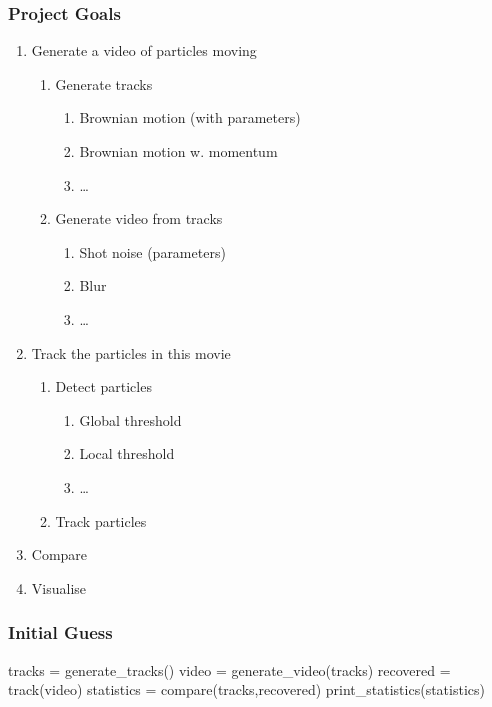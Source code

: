 \begin{frame}[fragile]
\frametitle{Project Goals}

\begin{enumerate}
\item Generate a video of particles moving
\begin{enumerate}[a]
\item<2-> Generate tracks
\begin{enumerate}[i]
\item<3-> \alert<4>{Brownian motion} (with parameters)
\item<3-> Brownian motion w. momentum
\item<3-> \ldots
\end{enumerate}
\item<2-> Generate video from tracks
\begin{enumerate}[i]
\item<3-> \alert<4>{Shot noise} (parameters)
\item<3-> Blur
\item<3-> \ldots
\end{enumerate}
\end{enumerate}
\item Track the particles in this movie
\begin{enumerate}[a]
\item<2-> Detect particles
\begin{enumerate}[i]
\item<3-> \alert<4>{Global threshold}
\item<3-> Local threshold
\item<3-> \ldots
\end{enumerate}
\item<2-> Track particles
\end{enumerate}
\item Compare
\item Visualise
\end{enumerate}
\end{frame}

\begin{frame}[fragile]
\frametitle{Initial Guess}

\begin{python}
tracks = generate_tracks()
video = generate_video(tracks)
recovered = track(video)
statistics = compare(tracks,recovered)
print_statistics(statistics)
\end{python}
\end{frame}


